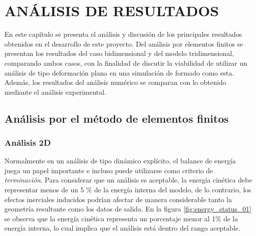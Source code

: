 \chapter{ANÁLISIS DE RESULTADOS}

En este capítulo se presenta el análisis y discusión de los principales resultados 
obtenidos en el desarrollo de este proyecto. Del análisis por elementos finitos 
se presentan los resultados del caso bidimensional y del modelo tridimensional, comparando 
ambos casos, con la finalidad de discutir la viabilidad de utilizar un análisis de tipo 
deformación plana en una simulación de formado como esta. Además, los resultados del 
análisis numérico se comparan con lo obtenido mediante el análisis experimental.\\


\section{Análisis por el método de elementos finitos}

\subsection{Análisis 2D}


Normalmente en un análisis de tipo dinámico explícito, el balance de energía juega 
un papel importante e incluso puede utilizarse como criterio de \textit{terminación}. 
Para considerar que un análisis es aceptable, la energía cinética debe representar 
menos de un 5 \% de la energía interna del modelo, de lo contrario, los efectos 
inerciales inducidos podrían afectar de manera considerable tanto la geometría 
resultante como los datos de salida. En la figura \ref{fig:energy_status_01} se observa 
que la energía cinética representa un porcentaje menor al 1\% de la energía interna, lo 
cual implica que el análisis está dentro del rango aceptable. \\

